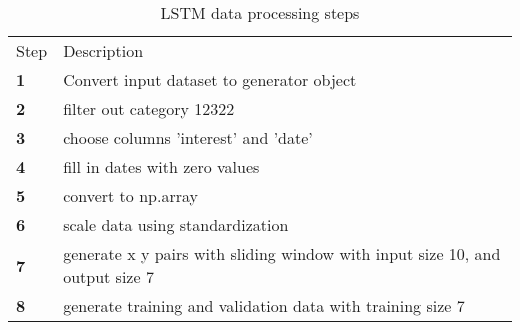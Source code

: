 \begin{table}[h]
  \caption{LSTM data processing steps}
  \label{table:lstm_data_processing_steps}
  \begin{tabular}{ll}
    \toprule
    Step       & Description                                                                  \\
    \textbf{1} & Convert input dataset to generator object                                    \\
    \textbf{2} & filter out category 12322                                                    \\
    \textbf{3} & choose columns 'interest' and 'date'                                         \\
    \textbf{4} & fill in dates with zero values                                               \\
    \textbf{5} & convert to np.array                                                          \\
    \textbf{6} & scale data using standardization                                             \\
    \textbf{7} & generate x y pairs with sliding window with input size 10, and output size 7 \\
    \textbf{8} & generate training and validation data with training size 7                   \\
    \bottomrule
  \end{tabular}
\end{table}


